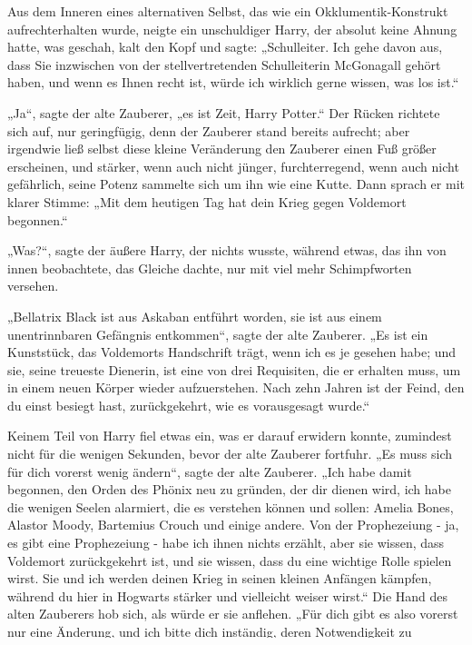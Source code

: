 {Aus dem Inneren eines alternativen Selbst, das wie ein Okklumentik-Konstrukt aufrechterhalten wurde, neigte ein unschuldiger Harry, der absolut keine Ahnung hatte, was geschah, kalt den Kopf und sagte: „Schulleiter. Ich gehe davon aus, dass Sie inzwischen von der stellvertretenden Schulleiterin McGonagall gehört haben, und wenn es Ihnen recht ist, würde ich wirklich gerne wissen, was los ist.“

„Ja“, sagte der alte Zauberer, „es ist Zeit, Harry Potter.“ Der Rücken richtete sich auf, nur geringfügig, denn der Zauberer stand bereits aufrecht; aber irgendwie ließ selbst diese kleine Veränderung den Zauberer einen Fuß größer erscheinen, und stärker, wenn auch nicht jünger, furchterregend, wenn auch nicht gefährlich, seine Potenz sammelte sich um ihn wie eine Kutte. Dann sprach er mit klarer Stimme: „Mit dem heutigen Tag hat dein Krieg gegen Voldemort begonnen.“

„Was?“, sagte der äußere Harry, der nichts wusste, während etwas, das ihn von innen beobachtete, das Gleiche dachte, nur mit viel mehr Schimpfworten versehen.

„Bellatrix Black ist aus Askaban entführt worden, sie ist aus einem unentrinnbaren Gefängnis entkommen“, sagte der alte Zauberer. „Es ist ein Kunststück, das Voldemorts Handschrift trägt, wenn ich es je gesehen habe; und sie, seine treueste Dienerin, ist eine von drei Requisiten, die er erhalten muss, um in einem neuen Körper wieder aufzuerstehen. Nach zehn Jahren ist der Feind, den du einst besiegt hast, zurückgekehrt, wie es vorausgesagt wurde.“

Keinem Teil von Harry fiel etwas ein, was er darauf erwidern konnte, zumindest nicht für die wenigen Sekunden, bevor der alte Zauberer fortfuhr. „Es muss sich für dich vorerst wenig ändern“, sagte der alte Zauberer. „Ich habe damit begonnen, den Orden des Phönix neu zu gründen, der dir dienen wird, ich habe die wenigen Seelen alarmiert, die es verstehen können und sollen: Amelia Bones, Alastor Moody, Bartemius Crouch und einige andere. Von der Prophezeiung - ja, es gibt eine Prophezeiung - habe ich ihnen nichts erzählt, aber sie wissen, dass Voldemort zurückgekehrt ist, und sie wissen, dass du eine wichtige Rolle spielen wirst. Sie und ich werden deinen Krieg in seinen kleinen Anfängen kämpfen, während du hier in Hogwarts stärker und vielleicht weiser wirst.“ Die Hand des alten Zauberers hob sich, als würde er sie anflehen. „Für dich gibt es also vorerst nur eine Änderung, und ich bitte dich inständig, deren Notwendigkeit zu verstehen. Erkennst du das Buch auf meinem Schreibtisch, Harry?“

}
